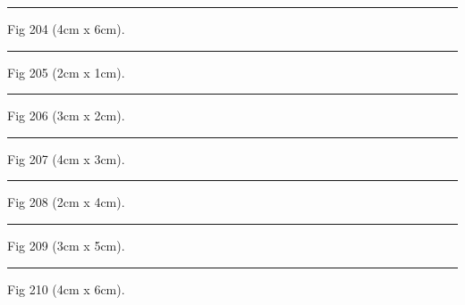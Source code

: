 \documentclass[a4paper,11pt]{article}
\begin{document}
\begin{swarmwrap}%
  \begin{minipage}[t]{4cm}
    \centering
    \rule{\linewidth}{6cm}
    {\footnotesize Fig 204 (4cm x 6cm).}
  \end{minipage}%
\end{swarmwrap}%
\swarmwrapnext
\lipsum[54]%

\begin{swarmwrap}%
  \begin{minipage}[t]{2cm}
    \centering
    \rule{\linewidth}{1cm}
    {\footnotesize Fig 205 (2cm x 1cm).}
  \end{minipage}%
\end{swarmwrap}%
\swarmwrapnext
\lipsum[55]%

\begin{swarmwrap}%
  \begin{minipage}[t]{3cm}
    \centering
    \rule{\linewidth}{2cm}
    {\footnotesize Fig 206 (3cm x 2cm).}
  \end{minipage}%
\end{swarmwrap}%
\swarmwrapnext
\lipsum[56]%

\begin{swarmwrap}%
  \begin{minipage}[t]{4cm}
    \centering
    \rule{\linewidth}{3cm}
    {\footnotesize Fig 207 (4cm x 3cm).}
  \end{minipage}%
\end{swarmwrap}%
\swarmwrapnext
\lipsum[57]%

\begin{swarmwrap}%
  \begin{minipage}[t]{2cm}
    \centering
    \rule{\linewidth}{4cm}
    {\footnotesize Fig 208 (2cm x 4cm).}
  \end{minipage}%
\end{swarmwrap}%
\swarmwrapnext
\lipsum[58]%

\begin{swarmwrap}%
  \begin{minipage}[t]{3cm}
    \centering
    \rule{\linewidth}{5cm}
    {\footnotesize Fig 209 (3cm x 5cm).}
  \end{minipage}%
\end{swarmwrap}%
\swarmwrapnext
\lipsum[59]%

\begin{swarmwrap}%
  \begin{minipage}[t]{4cm}
    \centering
    \rule{\linewidth}{6cm}
    {\footnotesize Fig 210 (4cm x 6cm).}
  \end{minipage}%
\end{swarmwrap}%
\swarmwrapnext
\lipsum[60]%
\end{document}
